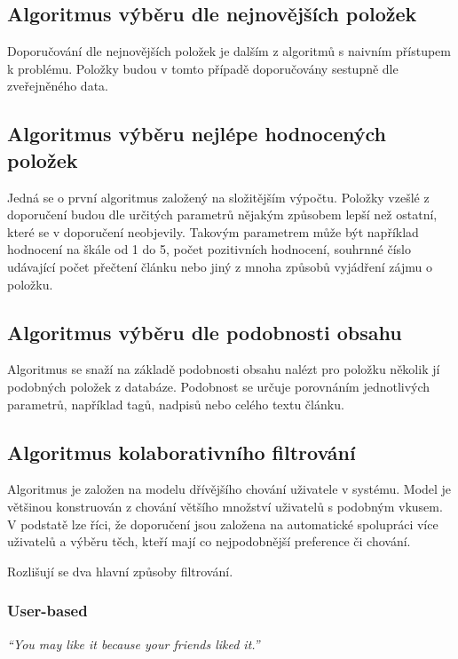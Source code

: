 \documentclass[thesis=M,czech]{FITthesis}[2014/05/07]
\begin{document}
\subsection{Algoritmus výběru dle nejnovějších položek}

Doporučování dle nejnovějších položek je dalším z algoritmů s naivním přístupem k problému. Položky budou v tomto případě doporučovány sestupně dle zveřejněného data. 

\subsection{Algoritmus výběru nejlépe hodnocených položek}

Jedná se o první algoritmus založený na složitějším výpočtu. Položky vzešlé z doporučení budou dle určitých parametrů nějakým způsobem lepší než ostatní, které se v doporučení neobjevily. Takovým parametrem může být například hodnocení na škále od 1 do 5, počet pozitivních hodnocení, souhrnné číslo udávající počet přečtení článku nebo jiný z mnoha způsobů vyjádření zájmu o položku. 

\subsection{Algoritmus výběru dle podobnosti obsahu}

Algoritmus se snaží na základě podobnosti obsahu nalézt pro položku několik jí podobných položek z databáze. Podobnost se určuje porovnáním jednotlivých parametrů, například tagů, nadpisů nebo celého textu článku.

\subsection{Algoritmus kolaborativního filtrování}

Algoritmus je založen na modelu dřívějšího chování uživatele v systému. Model je většinou konstruován z chování většího množství uživatelů s podobným vkusem. V podstatě lze říci, že doporučení jsou založena na automatické spolupráci více uživatelů a výběru těch, kteří mají co nejpodobnější preference či chování.

Rozlišují se dva hlavní způsoby filtrování.

\subsubsection{User-based}

\emph{``You may like it because your friends liked it.''}~\cite{cf}
\end{document}
